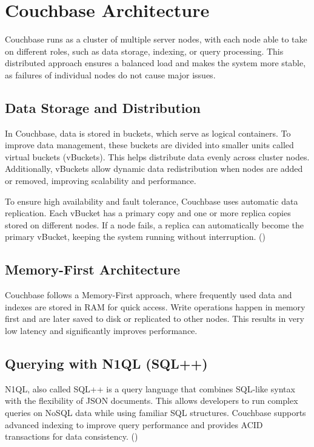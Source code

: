 \newpage

\chapter{Couchbase Architecture}
Couchbase runs as a cluster of multiple server nodes, with each node able to take on different roles, such as data storage, indexing, or query processing. This distributed approach ensures a balanced load and makes the system more stable, as failures of individual nodes do not cause major issues.

\section{Data Storage and Distribution}
In Couchbase, data is stored in buckets, which serve as logical containers. To improve data management, these buckets are divided into smaller units called virtual buckets (vBuckets). This helps distribute data evenly across cluster nodes. Additionally, vBuckets allow dynamic data redistribution when nodes are added or removed, improving scalability and performance.

To ensure high availability and fault tolerance, Couchbase uses automatic data replication. Each vBucket has a primary copy and one or more replica copies stored on different nodes. If a node fails, a replica can automatically become the primary vBucket, keeping the system running without interruption.
(\cite{CouchbaseArchitectureOverview})

\section{Memory-First Architecture}
Couchbase follows a Memory-First approach, where frequently used data and indexes are stored in RAM for quick access. Write operations happen in memory first and are later saved to disk or replicated to other nodes. This results in very low latency and significantly improves performance.

\section{Querying with N1QL (SQL++)}
N1QL, also called SQL++ is a query language that combines SQL-like syntax with the flexibility of JSON documents. This allows developers to run complex queries on NoSQL data while using familiar SQL structures. Couchbase supports advanced indexing to improve query performance and provides ACID transactions for data consistency.
(\cite{CouchbaseN1QL})

